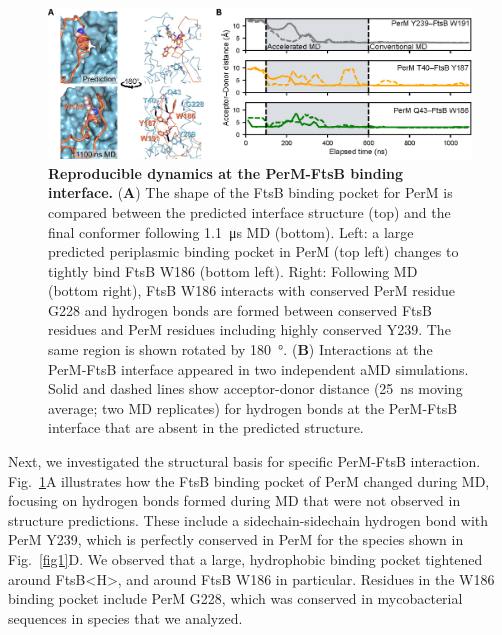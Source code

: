 \documentclass[pdflatex,sn-nature]{sn-jnl}%
\def\textsuperscript#1{<#1>}%
\newcommand\ftsbH{FtsB\textsuperscript{H}}
\begin{document}
\begin{figure}[t]
    \centering
    \includegraphics[width=1.0\textwidth]{./fig2.eps}
    \caption{
        \textbf{Reproducible dynamics at the PerM-FtsB binding interface.}
        (\textbf{A}) The shape of the FtsB binding pocket for PerM is compared between the predicted interface structure (top) and the final conformer following \qty{1.1}{\us} MD (bottom). Left: a large predicted periplasmic binding pocket in PerM (top left) changes to tightly bind FtsB W186 (bottom left). Right: Following MD (bottom right), FtsB W186 interacts with conserved PerM residue G228 and hydrogen bonds are formed between conserved FtsB residues and PerM residues including highly conserved Y239. The same region is shown rotated by \qty{180}{\degree}.
        (\textbf{B}) Interactions at the PerM-FtsB interface appeared in two independent aMD simulations. Solid and dashed lines show acceptor-donor distance (\qty{25}{\ns} moving average; two MD replicates) for hydrogen bonds at the PerM-FtsB interface that are absent in the predicted structure.
    }\label{fig2}
\end{figure}

Next, we investigated the structural basis for specific PerM-FtsB interaction.
Fig.~\ref{fig2}A illustrates how the FtsB binding pocket of PerM changed during MD, focusing on hydrogen bonds formed during MD that were not observed in structure predictions.
These include a sidechain-sidechain hydrogen bond with PerM Y239, which is perfectly conserved in PerM for the species shown in Fig.~\ref{fig1}D.
We observed that a large, hydrophobic binding pocket tightened around \ftsbH{}, and around FtsB W186 in particular.
Residues in the W186 binding pocket include PerM G228, which was conserved in mycobacterial sequences in species that we analyzed.
\end{document}
